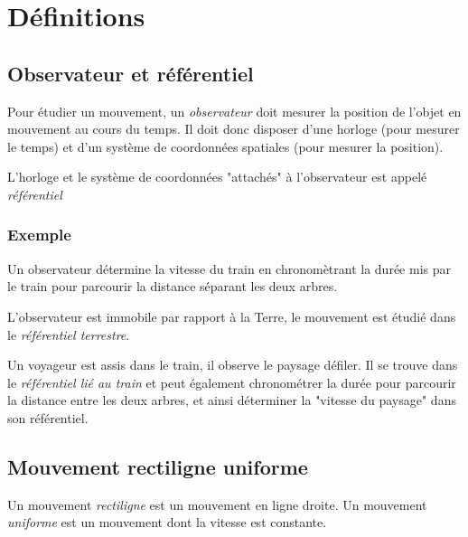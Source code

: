 

\section{Définitions}
  \subsection{Observateur et référentiel}

Pour étudier un mouvement, un {\it observateur} doit mesurer la position de l'objet en mouvement au cours du temps. Il doit donc disposer d'une horloge (pour mesurer le temps) et d'un système de coordonnées spatiales (pour mesurer la position).

L'horloge et le système de coordonnées "attachés" à l'observateur est appelé {\it référentiel}


    \subsubsection{Exemple}
Un observateur détermine la vitesse du train en chronomètrant la durée mis par le train pour parcourir la distance séparant les deux arbres.

\begin{center}

%
\end{center}

L'observateur est immobile par rapport à la Terre, le mouvement est étudié dans le {\it référentiel terrestre}.

Un voyageur est assis dans le train, il observe le paysage défiler. Il se trouve dans le {\it référentiel lié au train} et peut également chronométrer la durée pour parcourir la distance entre les deux arbres, et ainsi déterminer la "vitesse du paysage" dans son référentiel.


  \subsection{Mouvement rectiligne uniforme}

Un mouvement {\it rectiligne} est un mouvement en ligne droite. Un mouvement {\it uniforme} est un mouvement dont la vitesse est constante.




